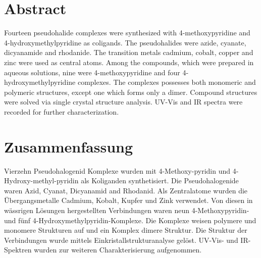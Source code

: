 

\chapter*{Abstract}
\label{cha:abstract}
Fourteen pseudohalide complexes were synthesized with 4-methoxypyridine and 4-hydroxymethylpyridine as coligands. The pseudohalides were azide, cyanate, dicyanamide and rhodanide. The transition metals cadmium, cobalt, copper and zinc were used as central atoms. Among the compounds, which were prepared in aqueous solutions, nine were 4-methoxypyridine and four 4-hydroxymethylpyridine complexes. The complexes possesses both monomeric and polymeric structures, except one which forms only a dimer. Compound structures were solved via single crystal structure analysis. UV-Vis and IR spectra were recorded for further characterization.


\chapter*{Zusammenfassung}

Vierzehn Pseudohalogenid Komplexe wurden mit 4-Methoxy-pyridin und 4-Hydroxy-methyl-pyridin als Koliganden synthetisiert. Die Pseudohalogenide waren Azid, Cyanat, Dicyanamid and Rhodanid. Als Zentralatome wurden die Übergangsmetalle Cadmium, Kobalt, Kupfer und Zink verwendet. Von diesen in wässrigen Lösungen hergestellten Verbindungen waren neun 4-Methoxypyridin- und fünf 4-Hydroxymethylpyridin-Komplexe. Die Komplexe weisen polymere und monomere Strukturen auf und ein Komplex dimere Struktur.
Die Struktur der Verbindungen wurde mittels Einkristallstrukturanalyse gelöst. UV-Vis- und IR-Spektren wurden zur weiteren Charakterisierung aufgenommen.